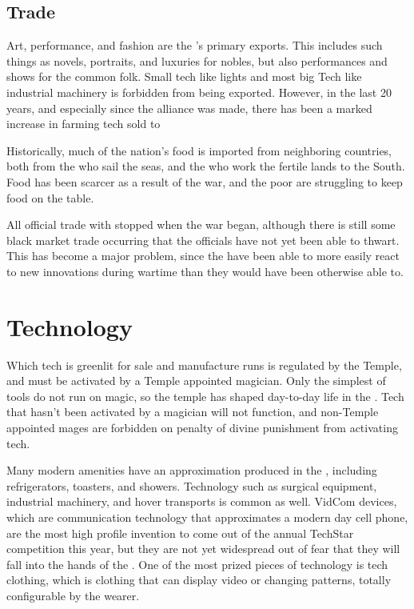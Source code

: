 \documentclass[blue]{GL2020}
\begin{document}
\subsection*{Trade}
Art, performance, and fashion are the \pTech{}’s primary exports. This includes such things as novels, portraits, and luxuries for nobles, but also performances and shows for the common folk. Small tech like lights and most big Tech like industrial machinery is forbidden from being exported. However, in the last 20 years, and especially since the alliance was made, there has been a marked increase in farming tech sold to \pFarm{}

Historically, much of the nation’s food is imported from neighboring countries, both from the \pShippies{} who sail the seas, and the \pFarmers{} who work the fertile lands to the South. Food has been scarcer as a result of the war, and the poor are struggling to keep food on the table.

All official trade with \pShip{} stopped when the war began, although there is still some black market trade occurring that the officials have not yet been able to thwart. This has become a major problem, since the \pShippies{} have been able to more easily react to new \pTech{} innovations during wartime than they would have been otherwise able to.

\section*{Technology}
Which tech is greenlit for sale and manufacture runs is regulated by the Temple, and must be activated by a Temple appointed magician. Only the simplest of tools do not run on magic, so the temple has shaped day-to-day life in the \pTech{}. Tech that hasn’t been activated by a magician will not function, and non-Temple appointed mages are forbidden on penalty of divine punishment from activating tech.

Many modern amenities have an approximation produced in the \pTech{}, including refrigerators, toasters, and showers. Technology such as surgical equipment, industrial machinery, and hover transports is common as well. VidCom devices, which are communication technology that approximates a modern day cell phone, are the most high profile invention to come out of the annual TechStar competition this year, but they are not yet widespread out of fear that they will fall into the hands of the \pShippies{}. One of the most prized pieces of technology is tech clothing, which is clothing that can display video or changing patterns, totally configurable by the wearer. 
\end{document}
